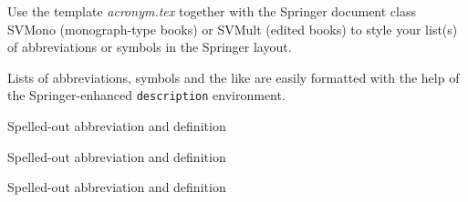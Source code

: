%
%


Use the template \emph{acronym.tex} together with the Springer document class SVMono (monograph-type books) or SVMult (edited books) to style your list(s) of abbreviations or symbols in the Springer layout.

Lists of abbreviations, symbols and the like are easily formatted with the help of the Springer-enhanced \verb|description| environment.

\begin{description}[CABR]
\item[ABC]{Spelled-out abbreviation and definition}
\item[BABI]{Spelled-out abbreviation and definition}
\item[CABR]{Spelled-out abbreviation and definition}
\end{description}